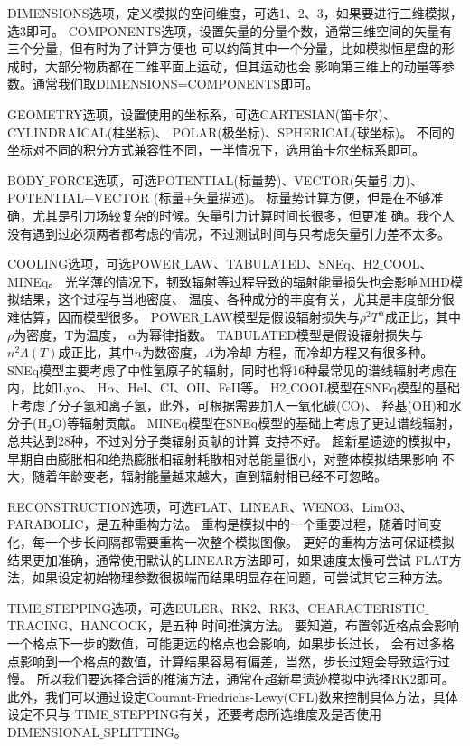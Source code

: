 DIMENSIONS选项，定义模拟的空间维度，可选1、2、3，如果要进行三维模拟，选3即可。
COMPONENTS选项，设置矢量的分量个数，通常三维空间的矢量有三个分量，但有时为了计算方便也
可以约简其中一个分量，比如模拟恒星盘的形成时，大部分物质都在二维平面上运动，但其运动也会
影响第三维上的动量等参数。通常我们取DIMENSIONS=COMPONENTS即可。

GEOMETRY选项，设置使用的坐标系，可选CARTESIAN(笛卡尔)、CYLINDRAICAL(柱坐标)、
POLAR(极坐标)、SPHERICAL(球坐标)。
不同的坐标对不同的积分方式兼容性不同，一半情况下，选用笛卡尔坐标系即可。

BODY$\_$FORCE选项，可选POTENTIAL(标量势)、VECTOR(矢量引力)、POTENTIAL+VECTOR
(标量+矢量描述)。
标量势计算方便，但是在不够准确，尤其是引力场较复杂的时候。矢量引力计算时间长很多，但更准
确。我个人没有遇到过必须两者都考虑的情况，不过测试时间与只考虑矢量引力差不太多。

COOLING选项，可选POWER$\_$LAW、TABULATED、SNEq、H2$\_$COOL、MINEq。
光学薄的情况下，韧致辐射等过程导致的辐射能量损失也会影响MHD模拟结果，这个过程与当地密度、
温度、各种成分的丰度有关，尤其是丰度部分很难估算，因而模型很多。
POWER$\_$LAW模型是假设辐射损失与$\rho^2T^{\alpha}$成正比，其中$\rho$为密度，T为温度，
$\alpha$为幂律指数。
TABULATED模型是假设辐射损失与$n^2\Lambda(T)$成正比，其中$n$为数密度，$\Lambda$为冷却
方程，而冷却方程又有很多种\citep{2017RMxAA..53..385F}。
SNEq模型主要考虑了中性氢原子的辐射，同时也将16种最常见的谱线辐射考虑在内，比如Ly$\alpha$、
H$\alpha$、HeI、CI、OII、FeII等。
H2$\_$COOL模型在SNEq模型的基础上考虑了分子氢和离子氢，此外，可根据需要加入一氧化碳(CO)、
羟基(OH)和水分子(H$_2$O)等辐射贡献。
MINEq模型在SNEq模型的基础上考虑了更过谱线辐射，总共达到28种，不过对分子类辐射贡献的计算
支持不好。
超新星遗迹的模拟中，早期自由膨胀相和绝热膨胀相辐射耗散相对总能量很小，对整体模拟结果影响
不大，随着年龄变老，辐射能量越来越大，直到辐射相已经不可忽略。

RECONSTRUCTION选项，可选FLAT、LINEAR、WENO3、LimO3、PARABOLIC，是五种重构方法。
重构是模拟中的一个重要过程，随着时间变化，每一个步长间隔都需要重构一次整个模拟图像。
更好的重构方法可保证模拟结果更加准确，通常使用默认的LINEAR方法即可，如果速度太慢可尝试
FLAT方法，如果设定初始物理参数很极端而结果明显存在问题，可尝试其它三种方法。

TIME$\_$STEPPING选项，可选EULER、RK2、RK3、CHARACTERISTIC$\_$TRACING、HANCOCK，是五种
时间推演方法。
要知道，布置邻近格点会影响一个格点下一步的数值，可能更远的格点也会影响，如果步长过长，
会有过多格点影响到一个格点的数值，计算结果容易有偏差，当然，步长过短会导致运行过慢。
所以我们要选择合适的推演方法，通常在超新星遗迹模拟中选择RK2即可。
此外，我们可以通过设定Courant-Friedrichs-Lewy(CFL)数来控制具体方法，具体设定不只与
TIME$\_$STEPPING有关，还要考虑所选维度及是否使用DIMENSIONAL$\_$SPLITTING。

